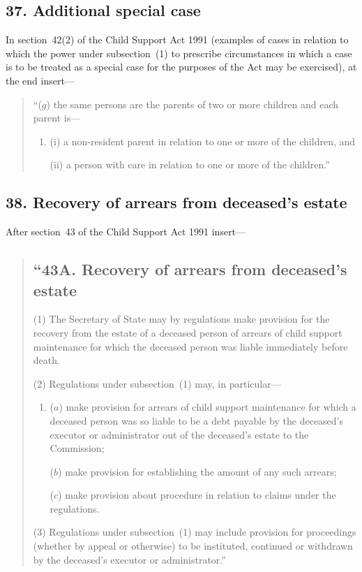 \documentclass[12pt,a4paper]{article}
\begin{document}
\subsection{37. Additional special case}

In section~42(2) of the Child Support Act 1991 (examples of cases in relation to which the power under subsection~(1) to prescribe circumstances in which a case is to be treated as a special case for the purposes of the Act may be exercised), at the end insert---
\begin{quotation}
``($g$) the same persons are the parents of two or more children and each parent is---
\begin{enumerate}\item[]
(i) a non-resident parent in relation to one or more of the children, and

(ii) a person with care in relation to one or more of the children.''
\end{enumerate}
\end{quotation}

\subsection{38. Recovery of arrears from deceased's estate}

After section~43 of the Child Support Act 1991 insert---

\begin{quotation}
\subsection*{``43A. Recovery of arrears from deceased's estate}

(1) The Secretary of State may by regulations make provision for the recovery from the estate of a deceased person of arrears of child support maintenance for which the deceased person was liable immediately before death.

(2) Regulations under subsection~(1) may, in particular---
\begin{enumerate}\item[]
($a$) make provision for arrears of child support maintenance for which a deceased person was so liable to be a debt payable by the deceased’s executor or administrator out of the deceased’s estate to the Commission;

($b$) make provision for establishing the amount of any such arrears;

($c$) make provision about procedure in relation to claims under the regulations.
\end{enumerate}

(3) Regulations under subsection~(1) may include provision for proceedings (whether by appeal or otherwise) to be instituted, continued or withdrawn by the deceased’s executor or administrator.''
\end{quotation}
\end{document}
